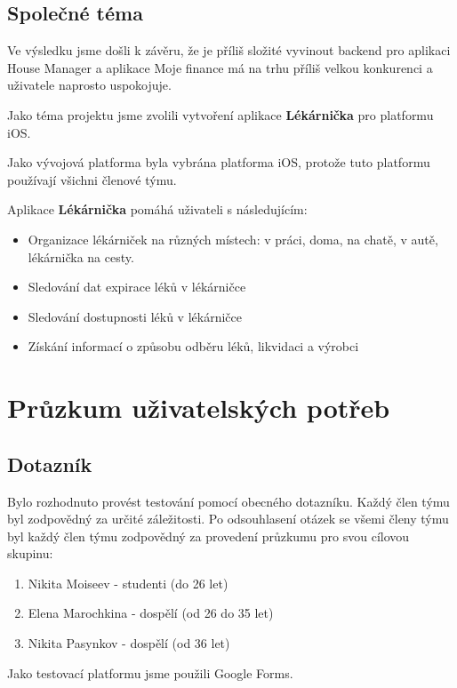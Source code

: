 \documentclass[a4paper, 11pt]{article}
\begin{document}
\subsection{Společné téma}
Ve výsledku jsme došli k závěru, že je příliš složité vyvinout backend pro aplikaci House Manager a aplikace Moje finance má na trhu příliš velkou konkurenci a uživatele naprosto uspokojuje.

Jako téma projektu jsme zvolili vytvoření aplikace \textbf{Lékárnička} pro platformu iOS.

Jako vývojová platforma byla vybrána platforma iOS, protože tuto platformu používají všichni členové týmu.

Aplikace \textbf{Lékárnička} pomáhá uživateli s následujícím:
\begin{itemize}
  \item Organizace lékárniček na různých místech: v práci, doma, na chatě, v autě, lékárnička na cesty.
  \item Sledování dat expirace léků v lékárničce
  \item Sledování dostupnosti léků v lékárničce
  \item Získání informací o způsobu odběru léků, likvidaci a výrobci
\end{itemize}

	\section{Průzkum uživatelských potřeb}

	\subsection{Dotazník}
 Bylo rozhodnuto provést testování pomocí obecného dotazníku. Každý člen týmu byl zodpovědný za určité záležitosti. Po odsouhlasení otázek se všemi členy týmu byl každý člen týmu zodpovědný za provedení průzkumu pro svou cílovou skupinu:
 \begin{enumerate}
     \item Nikita Moiseev - studenti (do 26 let)
     \item Elena Marochkina - dospělí (od 26 do 35 let)
     \item Nikita Pasynkov - dospělí (od 36 let)
 \end{enumerate}

Jako testovací platformu jsme použili Google Forms.
\end{document}
